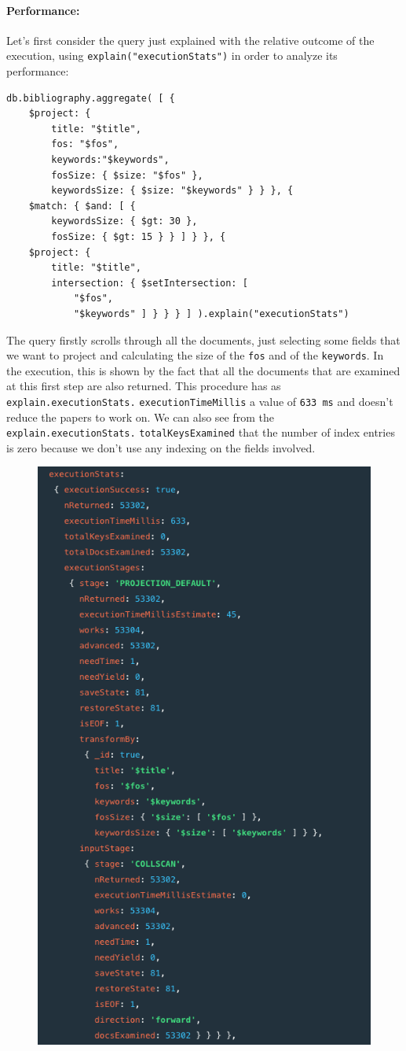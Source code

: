 \begin{enumerate}
    \paragraph{Performance:}
    Let's first consider the query just explained with the relative outcome of the execution, using \verb|explain("executionStats")| in order to analyze its performance:
    \begin{lstlisting}[label={lst:performance_query3mongodb}]
db.bibliography.aggregate( [ {
    $project: {
        title: "$title",
        fos: "$fos",
        keywords:"$keywords",
        fosSize: { $size: "$fos" },
        keywordsSize: { $size: "$keywords" } } }, {
    $match: { $and: [ {
        keywordsSize: { $gt: 30 },
        fosSize: { $gt: 15 } } ] } }, {
    $project: {
        title: "$title",
        intersection: { $setIntersection: [
            "$fos",
            "$keywords" ] } } } ] ).explain("executionStats")
    \end{lstlisting}
    The query firstly scrolls through all the documents, just selecting some fields that we want to project and calculating the size of the \verb|fos| and of the \verb|keywords|.
    In the execution, this is shown by the fact that all the documents that are examined at this first step are also returned.
    This procedure has as \verb|explain.executionStats.| \verb|executionTimeMillis| a value of \verb|633 ms| and doesn't reduce the papers to work on.
    We can also see from the \verb|explain.executionStats.| \verb|totalKeysExamined| that the number of index entries is zero because we don't use any indexing on the fields involved.
    \begin{figure}[H]
        \begin{center}
            \includegraphics[width=0.6\linewidth]{ImagesMongoDB/performance_query3mongodb1}

\end{center}
\end{figure}
\end{enumerate}
